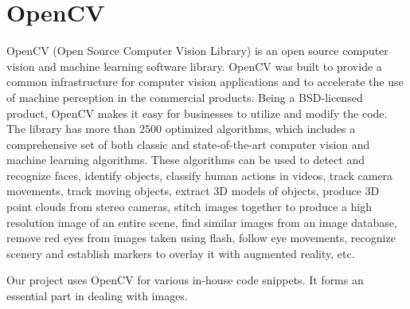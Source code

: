 \section{OpenCV} %
\label{sec:opencv}
OpenCV (Open Source Computer Vision Library) is an open source computer vision and machine learning software library. OpenCV was built to provide a common infrastructure for computer vision applications and to accelerate the use of machine perception in the commercial products. Being a BSD-licensed product, OpenCV makes it easy for businesses to utilize and modify the code. The library has more than 2500 optimized algorithms, which includes a comprehensive set of both classic and state-of-the-art computer vision and machine learning algorithms. These algorithms can be used to detect and recognize faces, identify objects, classify human actions in videos, track camera movements, track moving objects, extract 3D models of objects, produce 3D point clouds from stereo cameras, stitch images together to produce a high resolution image of an entire scene, find similar images from an image database, remove red eyes from images taken using flash, follow eye movements, recognize scenery and establish markers to overlay it with augmented reality, etc.
\par\bigskip
Our project uses OpenCV for various in-house code snippets. It forms an essential part in dealing with images.

